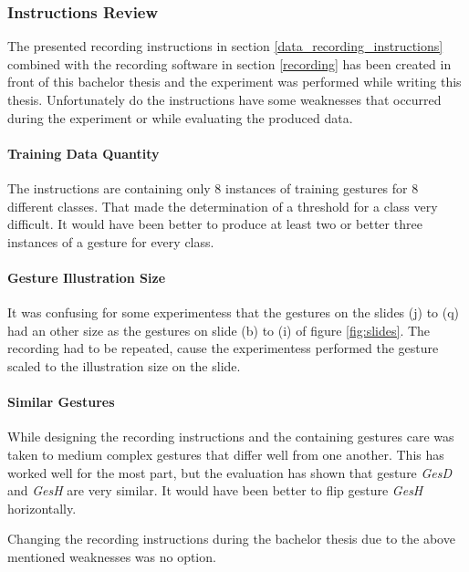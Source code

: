 \subsubsection{Instructions Review} \label{instructions_review}
The presented recording instructions in section \ref{data_recording_instructions} combined with the recording software
in section \ref{recording} has been created in front of this bachelor thesis and the experiment was performed while
writing this thesis. Unfortunately do the instructions have some weaknesses that occurred during the experiment or while
evaluating the produced data.

\paragraph{Training Data Quantity} The instructions are containing only 8 instances of training gestures for 8 different
classes. That made the determination of a threshold for a class very difficult. It would have been better to produce at
least two or better three instances of a gesture for every class.

\paragraph{Gesture Illustration Size} It was confusing for some experimentess that the gestures on the slides (j) to (q)
had an other size as the gestures on slide (b) to (i) of figure \ref{fig:slides}. The recording had to be repeated,
cause the experimentess performed the gesture scaled to the illustration size on the slide.

\paragraph{Similar Gestures} While designing the recording instructions and the containing gestures care was taken to
medium complex gestures that differ well from one another. This has worked well for the most part, but the evaluation
has shown that gesture \textit{GesD} and \textit{GesH} are very similar. It would have been better to flip gesture
\textit{GesH} horizontally.

Changing the recording instructions during the bachelor thesis due to the above mentioned weaknesses was no option.
